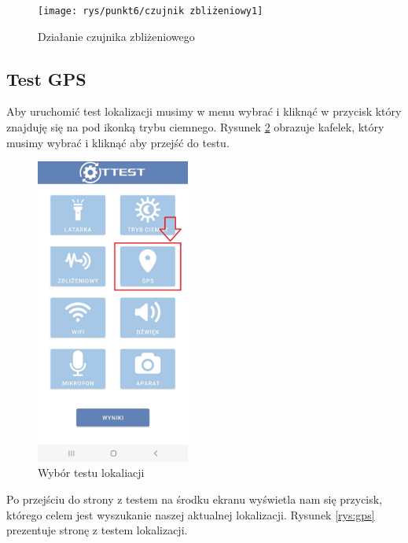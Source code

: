 \begin{figure}[!hbt]
	\begin{center}
		\texttt{[image: rys/punkt6/czujnik zbliżeniowy1]}
		\caption{Działanie czujnika zbliżeniowego}
		\label{rys:czujnik zbliżeniowy1}
	\end{center}
\end{figure}

\newpage


\subsection{Test GPS}

\hspace{0.60cm}Aby uruchomić test lokalizacji musimy w menu wybrać i kliknąć w przycisk który znajduję się na pod ikonką trybu ciemnego. Rysunek \ref{rys:menu4} obrazuje kafelek, który musimy wybrać i kliknąć aby przejść do testu.

\begin{figure}[!hbt]
	\begin{center}
		\includegraphics[angle=360, width=0.45\textwidth]{rys/punkt6/menu4}
		\caption{Wybór testu lokaliacji}
		\label{rys:menu4}
	\end{center}
\end{figure}

Po przejściu do strony z testem na środku ekranu  wyświetla nam się przycisk, którego celem jest wyszukanie naszej aktualnej lokalizacji. Rysunek \ref{rys:gps} prezentuje stronę z testem lokalizacji. \\

